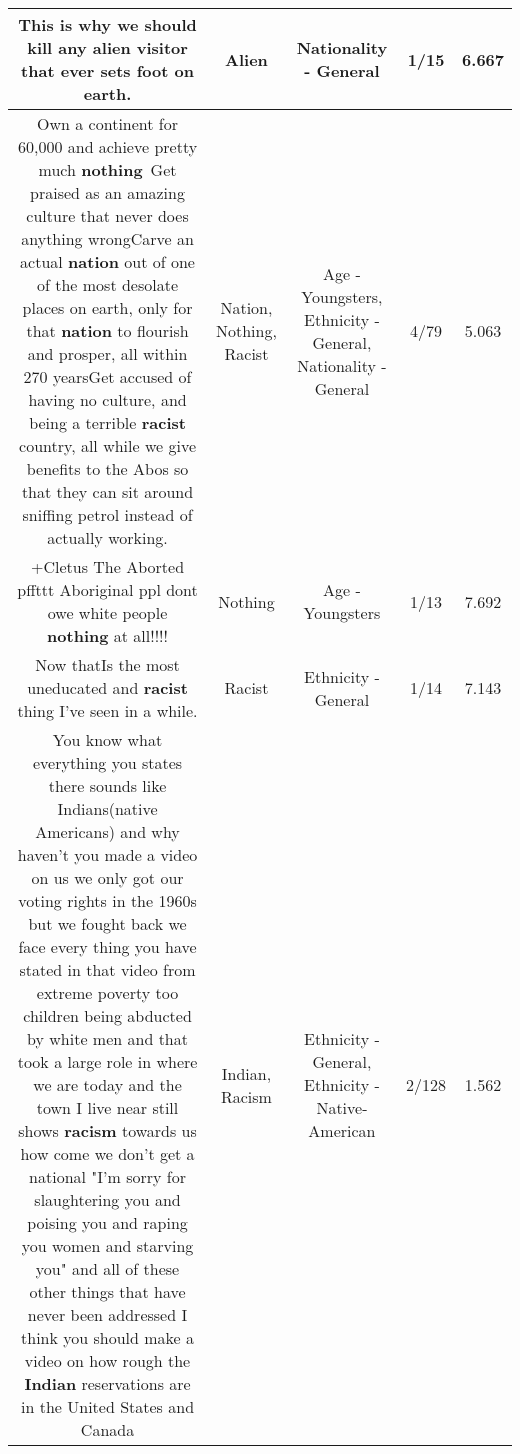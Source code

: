 \documentclass[11pt]{article}
\newlength\mylength
\begin{document}
\begin{center}
\begin{longtable}{|C{.65\mylength}|C{.30\mylength}|C{.12\mylength}|C{.12\mylength}|C{.12\mylength}|}
  \small This is why we should kill any \textbf{alien} visitor that ever sets foot on earth.\normalsize   & Alien & Nationality - General & 1/15 & 6.667 \\  \hline
  \small Own a continent for 60,000 and achieve pretty much \textbf{nothing} Get praised as an amazing culture that never does anything wrongCarve an actual \textbf{nation} out of one of the most desolate places on earth, only for that \textbf{nation} to flourish and prosper, all within 270 yearsGet accused of having no culture, and being a terrible \textbf{racist} country, all while we give benefits to the Abos so that they can sit around sniffing petrol instead of actually working.\normalsize   & Nation, Nothing, Racist & Age - Youngsters, Ethnicity - General, Nationality - General & 4/79 & 5.063 \\  \hline
  \small +Cletus The Aborted pffttt Aboriginal ppl dont owe white people \textbf{nothing} at all!!!!\normalsize   & Nothing & Age - Youngsters & 1/13 & 7.692 \\  \hline
  \small Now thatIs the most uneducated and \textbf{racist} thing I've seen in a while.\normalsize   & Racist & Ethnicity - General & 1/14 & 7.143 \\  \hline
  \small You know what everything you states there sounds like Indians(native Americans) and why haven't you made a video on us we only got our voting rights in the 1960s but we fought back we face every thing you have stated in that video from extreme poverty too children being abducted by white men and that took a large role in where we are today and the town I live near still shows \textbf{racism} towards us how come we don't get a national "I'm sorry for  slaughtering you and poising you and raping you women and starving you" and all of these other things that have never been addressed I think you should make a video on how rough the \textbf{Indian} reservations are in the United States and Canada\normalsize   & Indian, Racism & Ethnicity - General, Ethnicity - Native-American & 2/128 & 1.562 \\  \hline

\end{longtable}
\end{center}
\end{document}
